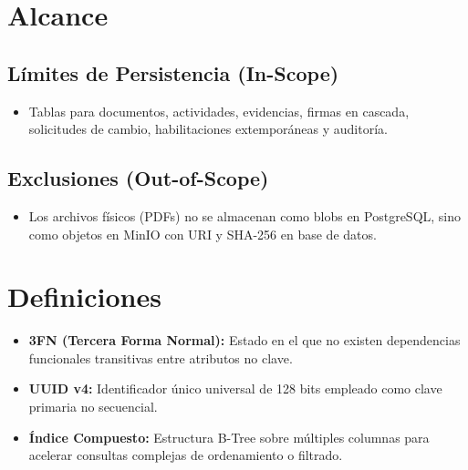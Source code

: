 \documentclass[12pt,a4paper]{article}
\begin{document}
\section{Alcance}

\subsection{Límites de Persistencia (In-Scope)}
\begin{itemize}[leftmargin=1.5em, itemsep=2pt]
    \item Tablas para documentos, actividades, evidencias, firmas en cascada, solicitudes de cambio, habilitaciones extemporáneas y auditoría.
\end{itemize}

\subsection{Exclusiones (Out-of-Scope)}
\begin{itemize}[leftmargin=1.5em, itemsep=2pt]
    \item Los archivos físicos (PDFs) no se almacenan como blobs en PostgreSQL, sino como objetos en MinIO con URI y SHA-256 en base de datos.
\end{itemize}

\section{Definiciones}
\begin{itemize}[leftmargin=1.5em, itemsep=2pt]
    \item \textbf{3FN (Tercera Forma Normal):} Estado en el que no existen dependencias funcionales transitivas entre atributos no clave.
    \item \textbf{UUID v4:} Identificador único universal de 128 bits empleado como clave primaria no secuencial.
    \item \textbf{Índice Compuesto:} Estructura B-Tree sobre múltiples columnas para acelerar consultas complejas de ordenamiento o filtrado.
\end{itemize}
\end{document}
